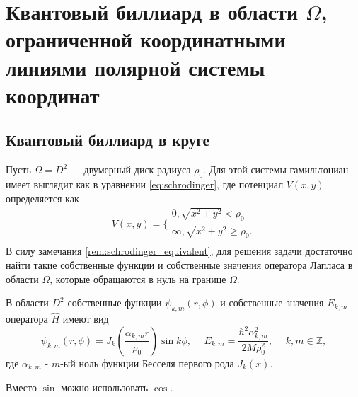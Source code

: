 \section{Квантовый биллиард в области $\Omega$, ограниченной координатными линиями полярной системы координат}\label{sec:ch1/sec2}

\subsection{Квантовый биллиард в круге}\label{sec:ch1/sec2/sub1}
Пусть $\Omega = D^2$ --- двумерный диск радиуса $\rho_0$. Для этой системы гамильтониан имеет выглядит как в уравнении \eqref{eq:schrodinger}, где 
потенциал $V(x,y)$ определяется как
\[
    V(x, y) = 
    \Bigg\{
    \begin{array}{cc}
        0, \sqrt{x^2+y^2} < \rho_0 \\
        \infty, \sqrt{x^2+y^2} \geq \rho_0. \\
    \end{array}
\] 
В силу замечания \ref{rem:schrodinger_equivalent}, для решения задачи достаточно найти такие собственные функции и собственные значения оператора Лапласа в области $\Omega$, которые обращаются в нуль на границе $\Omega$.
\begin{statement}
В области $D^2$ собственные функции $\psi_{k, m}(r, \phi)$ и собственные значения $E_{k,m}$ оператора $\hat{H}$ имеют вид 
$$\psi_{k, m}(r, \phi) = J_k\left(\frac{\alpha_{k, m}r}{\rho_0}\right)\sin{k \phi}, \hspace{15pt} E_{k,m} = \frac{\hbar^2 \alpha_{k, m}^2}{2M\rho_0^2}, \hspace{15pt} k, m \in \mathbb{Z},$$
где $\alpha_{k, m}$ - $m$-ый ноль функции Бесселя первого рода $J_k(x)$.
\label{st:sec1_stat1}
\end{statement}
\begin{remark}
Вместо $\sin$ можно использовать $\cos$.
\end{remark}
